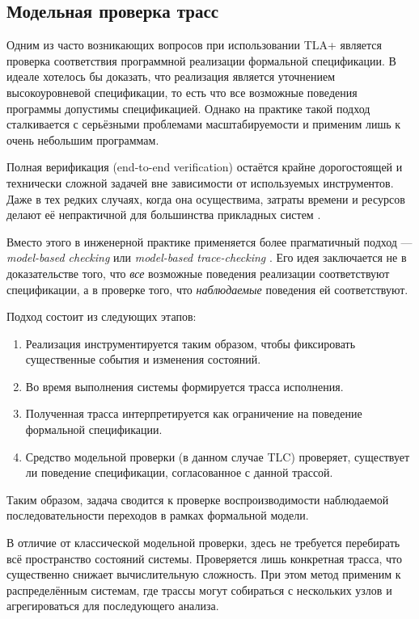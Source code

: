 \subsection{Модельная проверка трасс}

Одним из часто возникающих вопросов при использовании TLA+ является проверка
соответствия программной реализации формальной спецификации. В идеале хотелось
бы доказать, что реализация является уточнением высокоуровневой спецификации,
то есть что все возможные поведения программы допустимы спецификацией.
Однако на практике такой подход сталкивается с серьёзными проблемами
масштабируемости и применим лишь к очень небольшим программам.

Полная верификация (end-to-end verification) остаётся крайне дорогостоящей и
технически сложной задачей вне зависимости от используемых инструментов. Даже в
тех редких случаях, когда она осуществима, затраты времени и ресурсов делают её
непрактичной для большинства прикладных систем \cite{cirstea2024validating}.

Вместо этого в инженерной практике применяется более прагматичный подход —
\emph{model-based checking} или \emph{model-based trace-checking}
\cite{howard2011tracechecking}. Его идея заключается не в доказательстве того,
что \emph{все} возможные поведения реализации соответствуют спецификации, а в
проверке того, что \emph{наблюдаемые} поведения ей соответствуют.

Подход состоит из следующих этапов:

\begin{enumerate}
    \item Реализация инструментируется таким образом, чтобы фиксировать
    существенные события и изменения состояний.
    \item Во время выполнения системы формируется трасса исполнения.
    \item Полученная трасса интерпретируется как ограничение на поведение
    формальной спецификации.
    \item Средство модельной проверки (в данном случае TLC) проверяет,
    существует ли поведение спецификации, согласованное с данной трассой.
\end{enumerate}

Таким образом, задача сводится к проверке воспроизводимости наблюдаемой
последовательности переходов в рамках формальной модели.

В отличие от классической модельной проверки, здесь не требуется перебирать всё
пространство состояний системы. Проверяется лишь конкретная трасса, что
существенно снижает вычислительную сложность. При этом метод применим к
распределённым системам, где трассы могут собираться с нескольких узлов и
агрегироваться для последующего анализа.


